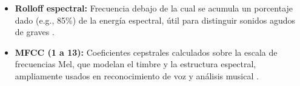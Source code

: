 \begin{itemize}
    \item \textbf{Rolloff espectral:} Frecuencia debajo de la cual se acumula un porcentaje dado (e.g., 85\%) de la energía espectral, útil para distinguir sonidos agudos de graves \cite{tzanetakis2002musical}.

    \item \textbf{MFCC (1 a 13):} Coeficientes cepstrales calculados sobre la escala de frecuencias Mel, que modelan el timbre y la estructura espectral, ampliamente usados en reconocimiento de voz y análisis musical \cite{davis1980comparison}.
\end{itemize}


